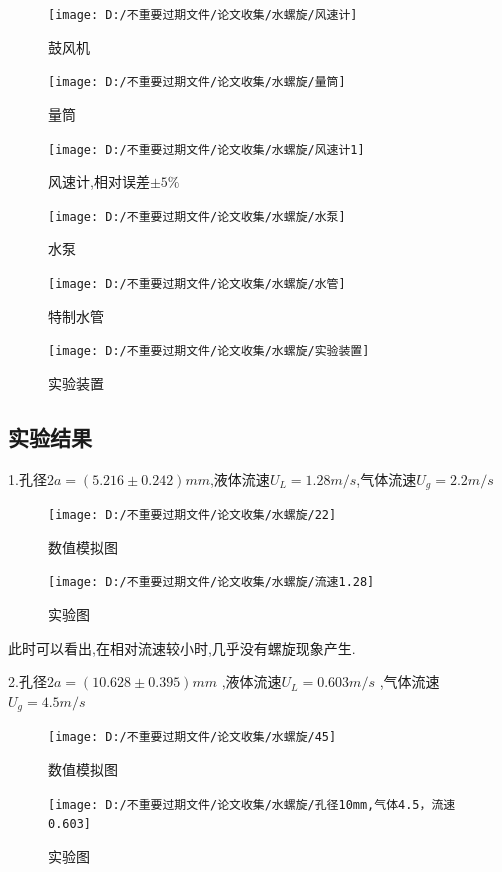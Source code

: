 \documentclass[UTF8]{gapd}
\begin{document}
\begin{figure}[!htbp]%
	\centering
	\texttt{[image: D:/不重要过期文件/论文收集/水螺旋/风速计]}
	\caption{鼓风机}
	\label{fig:P2}%
\end{figure}
\begin{figure}[!htbp]%
	\centering
	\texttt{[image: D:/不重要过期文件/论文收集/水螺旋/量筒]}
	\caption{量筒}
	\label{fig:P2}%
\end{figure}
\begin{figure}[!htbp]%
	\centering
	\texttt{[image: D:/不重要过期文件/论文收集/水螺旋/风速计1]}
	\caption{风速计,相对误差$		\pm 5\%		$}
	\label{fig:P2}%
\end{figure}
\begin{figure}[!htbp]%
	\centering
	\texttt{[image: D:/不重要过期文件/论文收集/水螺旋/水泵]}
	\caption{水泵}
	\label{fig:P2}%
\end{figure}
\begin{figure}[!htbp]%
	\centering
	\texttt{[image: D:/不重要过期文件/论文收集/水螺旋/水管]}
	\caption{特制水管}
	\label{fig:P2}%
\end{figure}
\begin{figure}[!htbp]%
	\centering
	\texttt{[image: D:/不重要过期文件/论文收集/水螺旋/实验装置]}
	\caption{实验装置}
	\label{fig:P2}%
\end{figure}

\subsection{实验结果}
1.孔径$2a=(5.216\pm0.242)mm$,液体流速$U_{L}=1.28m/s$,气体流速$U_{g}=2.2m/s$
\begin{figure}[H]
	\centering
	\texttt{[image: D:/不重要过期文件/论文收集/水螺旋/22]}
	\caption{数值模拟图}
	\label{fig:P2}
\end{figure}
\begin{figure}[H]
	\centering
	\texttt{[image: D:/不重要过期文件/论文收集/水螺旋/流速1.28]}
	\caption{实验图}
	\label{fig:P2}
\end{figure}

此时可以看出,在相对流速较小时,几乎没有螺旋现象产生.

2.孔径$2a=(10.628 \pm0.395)mm$ ,液体流速$U_{L}=0.603m/s$      ,气体流速$U_{g}=4.5m/s$
\begin{figure}[H]
	\centering
	\texttt{[image: D:/不重要过期文件/论文收集/水螺旋/45]}
	\caption{数值模拟图}
	\label{fig:P2}
\end{figure}
\begin{figure}[H]
	\centering
	\texttt{[image: D:/不重要过期文件/论文收集/水螺旋/孔径10mm,气体4.5，流速0.603]}
	\caption{实验图}
	\label{fig:P2}
\end{figure}
\end{document}
